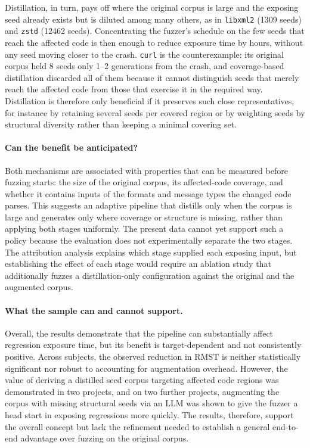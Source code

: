 Distillation, in turn, pays off where the original corpus is large and the exposing seed already exists but is diluted among many others, as in \texttt{libxml2} (\num{1309} seeds) and \texttt{zstd} (\num{12462} seeds).
Concentrating the fuzzer's schedule on the few seeds that reach the affected code is then enough to reduce exposure time by hours, without any seed moving closer to the crash.
\texttt{curl} is the counterexample: its original corpus held \num{8} seeds only \numrange{1}{2} generations from the crash, and coverage-based distillation discarded all of them because it cannot distinguish seeds that merely reach the affected code from those that exercise it in the required way.
Distillation is therefore only beneficial if it preserves such close representatives, for instance by retaining several seeds per covered region or by weighting seeds by structural diversity rather than keeping a minimal covering set.
 
\paragraph{Can the benefit be anticipated?}
Both mechanisms are associated with properties that can be measured before fuzzing starts: the size of the original corpus, its affected-code coverage, and whether it contains inputs of the formats and message types the changed code parses.
This suggests an adaptive pipeline that distills only when the corpus is large and generates only where coverage or structure is missing, rather than applying both stages uniformly.
The present data cannot yet support such a policy because the evaluation does not experimentally separate the two stages.
The attribution analysis explains which stage supplied each exposing input, but establishing the effect of each stage would require an ablation study that additionally fuzzes a distillation-only configuration against the original and the augmented corpus.
 
 
\paragraph{What the sample can and cannot support.}
Overall, the results demonstrate that the pipeline can substantially affect regression exposure time, but its benefit is target-dependent and not consistently positive.
Across subjects, the observed reduction in \ac{RMST} is neither statistically significant nor robust to accounting for augmentation overhead.
However, the value of deriving a distilled seed corpus targeting affected code regions was demonstrated in two projects, and on two further projects, augmenting the corpus with missing structural seeds via an \ac{LLM} was shown to give the fuzzer a head start in exposing regressions more quickly.
The results, therefore, support the overall concept but lack the refinement needed to establish a general end-to-end advantage over fuzzing on the original corpus.

